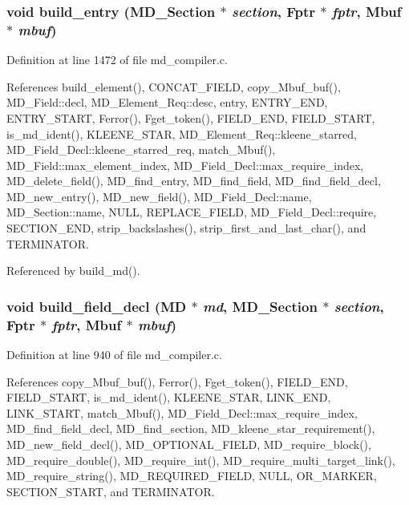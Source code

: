 \subsubsection{\setlength{\rightskip}{0pt plus 5cm}void build\_\-entry (\bf{MD\_\-Section} $\ast$ {\em section}, \bf{Fptr} $\ast$ {\em fptr}, \bf{Mbuf} $\ast$ {\em mbuf})}\label{md__compiler_8h_4a74b90f11f6771e28a937a67442c253}




Definition at line 1472 of file md\_\-compiler.c.

References build\_\-element(), CONCAT\_\-FIELD, copy\_\-Mbuf\_\-buf(), MD\_\-Field::decl, MD\_\-Element\_\-Req::desc, entry, ENTRY\_\-END, ENTRY\_\-START, Ferror(), Fget\_\-token(), FIELD\_\-END, FIELD\_\-START, is\_\-md\_\-ident(), KLEENE\_\-STAR, MD\_\-Element\_\-Req::kleene\_\-starred, MD\_\-Field\_\-Decl::kleene\_\-starred\_\-req, match\_\-Mbuf(), MD\_\-Field::max\_\-element\_\-index, MD\_\-Field\_\-Decl::max\_\-require\_\-index, MD\_\-delete\_\-field(), MD\_\-find\_\-entry, MD\_\-find\_\-field, MD\_\-find\_\-field\_\-decl, MD\_\-new\_\-entry(), MD\_\-new\_\-field(), MD\_\-Field\_\-Decl::name, MD\_\-Section::name, NULL, REPLACE\_\-FIELD, MD\_\-Field\_\-Decl::require, SECTION\_\-END, strip\_\-backslashes(), strip\_\-first\_\-and\_\-last\_\-char(), and TERMINATOR.

Referenced by build\_\-md().
\subsubsection{\setlength{\rightskip}{0pt plus 5cm}void build\_\-field\_\-decl (\bf{MD} $\ast$ {\em md}, \bf{MD\_\-Section} $\ast$ {\em section}, \bf{Fptr} $\ast$ {\em fptr}, \bf{Mbuf} $\ast$ {\em mbuf})}\label{md__compiler_8h_0449f410c0cc6716a3783605146dcaf9}




Definition at line 940 of file md\_\-compiler.c.

References copy\_\-Mbuf\_\-buf(), Ferror(), Fget\_\-token(), FIELD\_\-END, FIELD\_\-START, is\_\-md\_\-ident(), KLEENE\_\-STAR, LINK\_\-END, LINK\_\-START, match\_\-Mbuf(), MD\_\-Field\_\-Decl::max\_\-require\_\-index, MD\_\-find\_\-field\_\-decl, MD\_\-find\_\-section, MD\_\-kleene\_\-star\_\-requirement(), MD\_\-new\_\-field\_\-decl(), MD\_\-OPTIONAL\_\-FIELD, MD\_\-require\_\-block(), MD\_\-require\_\-double(), MD\_\-require\_\-int(), MD\_\-require\_\-multi\_\-target\_\-link(), MD\_\-require\_\-string(), MD\_\-REQUIRED\_\-FIELD, NULL, OR\_\-MARKER, SECTION\_\-START, and TERMINATOR.

